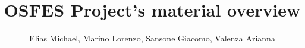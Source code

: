 

\title{OSFES Project's material overview}
\author{Elias Michael, Marino Lorenzo, Sansone Giacomo, Valenza Arianna}




\tableofcontents









